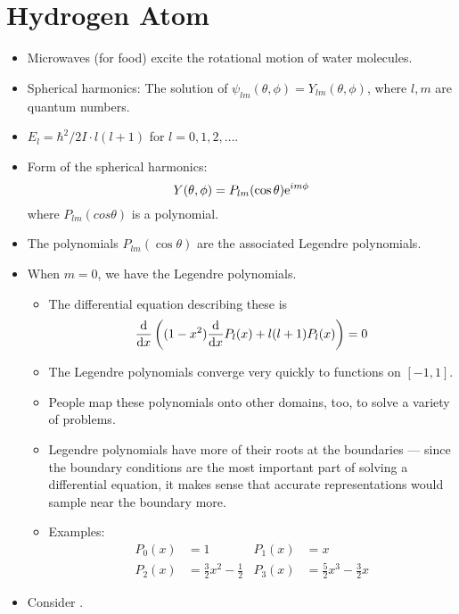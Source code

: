 \documentclass[../notes.tex]{subfiles}
\begin{document}
\section{Hydrogen Atom}
\begin{itemize}
    \item {}Microwaves (for food) excite the rotational motion of water molecules.
    \item Spherical harmonics: The solution of $\psi_{lm}(\theta,\phi)=Y_{lm}(\theta,\phi)$, where $l,m$ are quantum numbers.
    \item $E_l=\hbar^2/2I\cdot l(l+1)$ for $l=0,1,2,\dots$.
    \item Form of the spherical harmonics:
    \begin{equation*}
        Y(\theta,\phi) = P_{lm}(\cos\theta)\e[im\phi]
    \end{equation*}
    where $P_{lm}(cos\theta)$ is a polynomial.
    \item The polynomials $P_{lm}(\cos\theta)$ are the associated Legendre polynomials.
    \item When $m=0$, we have the Legendre polynomials.
    \begin{itemize}
        \item The differential equation describing these is
        \begin{equation*}
            \dv{x}\left( (1-x^2)\dv{x}P_l(x)+l(l+1)P_l(x) \right) = 0
        \end{equation*}
        \item The Legendre polynomials converge very quickly to functions on $[-1,1]$.
        \item People map these polynomials onto other domains, too, to solve a variety of problems.
        \item Legendre polynomials have more of their roots at the boundaries --- since the boundary conditions are the most important part of solving a differential equation, it makes sense that accurate representations would sample near the boundary more.
        \item Examples:
        \begin{align*}
            P_0(x) &= 1&
            P_1(x) &= x\\
            P_2(x) &= \frac{3}{2}x^2-\frac{1}{2}&
            P_3(x) &= \frac{5}{2}x^3-\frac{3}{2}x
        \end{align*}
    \end{itemize}
    \item Consider .

\end{itemize}
\end{document}
